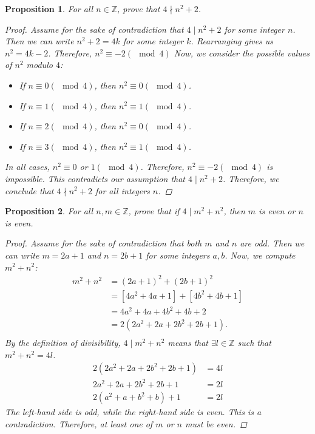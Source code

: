 \documentclass[12pt]{article}
\newcommand{\Z}{\mathbb{Z}} %
\newtheorem{proposition}{Proposition}
\begin{document}
\begin{proposition}
  For all $n \in \Z$, prove that $4 \nmid n^2 + 2$.
  \begin{proof}
    Assume for the sake of contradiction that $4 \mid n^2 + 2$ for some integer $n$.
    Then we can write $n^2 + 2 = 4k$ for some integer $k$.
    Rearranging gives us $n^2 = 4k - 2$. Therefore, $n^2 \equiv -2 (\mod 4)$
    Now, we consider the possible values of $n^2$ modulo $4$:
    \begin{itemize}
      \item If $n \equiv 0 (\mod 4)$, then $n^2 \equiv 0 (\mod 4)$.
      \item If $n \equiv 1 (\mod 4)$, then $n^2 \equiv 1 (\mod 4)$.
      \item If $n \equiv 2 (\mod 4)$, then $n^2 \equiv 0 (\mod 4)$.
      \item If $n \equiv 3 (\mod 4)$, then $n^2 \equiv 1 (\mod 4)$.
    \end{itemize}
    In all cases, $n^2 \equiv 0$ or $1 (\mod 4)$.
    Therefore, $n^2 \equiv -2 (\mod 4)$ is impossible.
    This contradicts our assumption that $4 \mid n^2 + 2$.
    Therefore, we conclude that $4 \nmid n^2 + 2$ for all integers $n$.
  \end{proof}
\end{proposition}


\begin{proposition}
  For all $n, m \in \Z$, prove that if $4 \mid m^2 + n^2$, then $m$ is even or $n$ is even.
  \begin{proof}
    Assume for the sake of contradiction that both $m$ and $n$ are odd.
    Then we can write $m = 2a + 1$ and $n = 2b + 1$ for some integers $a, b$.
    Now, we compute $m^2 + n^2$:
    \begin{align*}
      m^2 + n^2
       & = (2a + 1)^2 + (2b + 1)^2           \\
       & = [4a^2 + 4a + 1] + [4b^2 + 4b + 1] \\
       & = 4a^2 + 4a + 4b^2 + 4b + 2         \\
       & = 2(2a^2 + 2a + 2b^2 + 2b + 1).     \\
    \end{align*}
    By the definition of divisibility, $4 \mid m^2 + n^2$ means that $\exists l \in \Z$ such that $m^2 + n^2 = 4l$.
    \begin{align*}
      2(2a^2 + 2a + 2b^2 + 2b + 1) & = 4l \\
      2a^2 + 2a + 2b^2 + 2b + 1    & = 2l \\
      2(a^2 + a + b^2 + b) + 1     & = 2l
    \end{align*}
    The left-hand side is odd, while the right-hand side is even.
    This is a contradiction.
    Therefore, at least one of $m$ or $n$ must be even.
  \end{proof}
\end{proposition}


\end{document}
